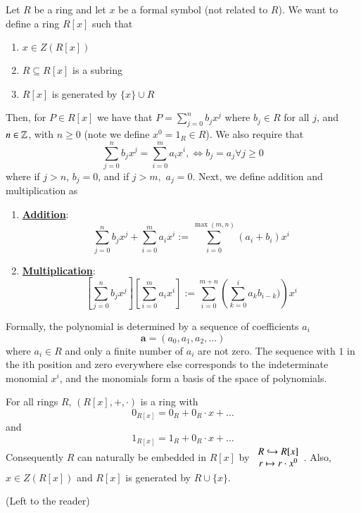 \documentclass[12pt, a4paper, twoside, openright, titlepage]{book}
\begin{document}
\begin{defn}{}{}
    Let $R$ be a ring and let $x$ be a formal symbol (not related to $R$). We want to define a ring $R[x]$ such that \begin{enumerate}
        \item $x \in Z(R[x])$
        \item $R \subseteq R[x]$ is a subring
        \item $R[x]$ is generated by $\{x\}\cup R$
    \end{enumerate}
    Then, for $P \in R[x]$ we have that $P = \sum\limits_{j=0}^nb_jx^j$ where $b_j \in R$ for all $j$, and $n \in \mathbb Z$, with $n \geq 0$ (note we define $x^0 = 1_R \in R$). We also require that \begin{equation}
        \sum\limits_{j=0}^nb_jx^j = \sum\limits_{i=0}^ma_ix^i, \iff b_j = a_j \forall j\geq 0
    \end{equation}
    where if $j > n$, $b_j = 0$, and if $j > m,$ $a_j = 0$. Next, we define addition and multiplication as 
    \begin{enumerate}
        \item[]\underline{\textbf{Addition}}: $$\sum\limits_{j=0}^nb_jx^j + \sum\limits_{i=0}^ma_ix^i := \sum\limits_{i=0}^{\max(m,n)}(a_i+b_i)x^i$$
        \item[] \underline{\textbf{Multiplication}}: $$\left[\sum\limits_{j=0}^nb_jx^j\right] \left[\sum\limits_{i=0}^ma_ix^i\right] := \sum\limits_{i=0}^{m+n}\left(\sum\limits_{k=0}^ia_{k}b_{i-k})\right)x^i$$
    \end{enumerate}
\end{defn}

\begin{rmk}{}{}
    Formally, the polynomial is determined by a sequence of coefficients $a_i$ \begin{equation}
                \mathbf{a} = (a_0,a_1,a_2,...)
        \end{equation}
    where $a_i \in R$ and only a finite number of $a_i$ are not zero. The sequence with $1$ in the ith position and zero everywhere else corresponds to the indeterminate monomial $x^i$, and the monomials form a basis of the space of polynomials.
\end{rmk}

\begin{claim}{}{}
    For all rings $R$, $(R[x], +, \cdot)$ is a ring with \begin{equation}
        0_{R[x]} = 0_R + 0_R\cdot x + ...
    \end{equation}
    and \begin{equation}
        1_{R[x]} = 1_R + 0_R\cdot x + ...
    \end{equation}
    Consequently $R$ can naturally be embedded in $R[x]$ by $\begin{array}{c} R \hookrightarrow R[x] \\ r \mapsto r\cdot x^0 \end{array}$. Also, $x \in Z(R[x])$ and $R[x]$ is generated by $R\cup \{x\}$.
    \begin{proof*}{}{}
        (Left to the reader)
    \end{proof*}
\end{claim}
\end{document}
